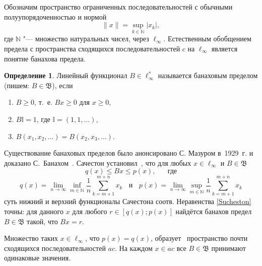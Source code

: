 \documentclass{vzmsthesis}
\theoremstyle{definition}
\newtheorem{definition}[lemma]{Определение}
\begin{document}

\vzmscaption


Обозначим пространство ограниченных последовательностей с обычными полуупорядоченностью и нормой
\begin{equation*}
	\|x\| = \sup_{k\in\mathbb{N}} |x_k|
	,
\end{equation*}
где $\mathbb{N}$ "--- множество натуральных чисел, через $\ell_\infty$.
Естественным обобщением предела с пространства сходящихся последовательностей $c$ на $\ell_\infty$
является понятие банахова предела.


\begin{definition}
	Линейный функционал $B\in \ell_\infty^*$ называется банаховым пределом
	(пишем: $B \in \mathfrak{B}$),
	если
	\begin{enumerate}
		\item
			$B\geq0$, т.~е. $Bx \geq 0$ для $x \geq 0$,
		\item
			$B\mathbb{I}=1$, где $\mathbb{I} =(1,1,\ldots)$,
		\item
			$B(x_1,x_2,\ldots)=B(x_2,x_3,\ldots)$.
	\end{enumerate}
\end{definition}
Существование банаховых пределов было анонсировано С. Мазуром в~1929~г. и доказано С.~Банахом~\cite{banach1993theorie}.
%
Сачестон установил~\cite{sucheston1967banach}, что
для любых $x\in \ell_\infty$ и $B\in\mathfrak{B}$
\begin{equation}\label{Sucheston}
	q(x) \leqslant Bx \leqslant p(x)
	,
	\quad\mbox{~~где}
\end{equation}
\begin{equation*}
	q(x) = \lim_{n\to\infty} \inf_{m\in\mathbb{N}}  \frac{1}{n} \sum_{k=m+1}^{m+n} x_k
	~~~~\mbox{и}~~~~
	p(x) = \lim_{n\to\infty} \sup_{m\in\mathbb{N}}  \frac{1}{n} \sum_{k=m+1}^{m+n} x_k
\end{equation*}
суть нижний и верхний функционалы Сачестона соотв.
Неравенства \eqref{Sucheston} точны:
для данного $x$ для любого $r\in[q(x); p(x)]$ найдётся банахов предел
$B\in\mathfrak{B}$ такой, что $Bx = r$.

Множество таких $x\in\ell_\infty$, что $p(x)=q(x)$,
образует~\cite{lorentz1948contribution} пространство почти сходящихся последовательностей $ac$.
На каждом $x\in ac$ все $B\in \mathfrak{B}$ принимают одинаковые значения.
\end{document}
